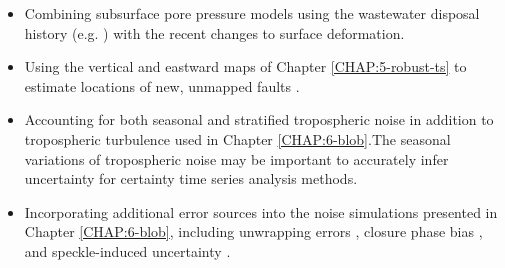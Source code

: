 \begin{itemize}



\item Combining subsurface pore pressure models using the wastewater disposal history (e.g. \cite{Ge2022RecentWaterDisposal}) with the recent changes to surface deformation.

\item Using the vertical and eastward maps of Chapter \ref{CHAP:5-robust-ts} to estimate locations of new, unmapped faults \citep{Horne2021BasementRootedFaults}.



\item Accounting for both seasonal and stratified tropospheric noise in addition to tropospheric turbulence used in Chapter \ref{CHAP:6-blob}.The seasonal variations of tropospheric noise may be important to accurately infer uncertainty for certainty time series analysis methods.

\item Incorporating additional error sources into the noise simulations presented in Chapter \ref{CHAP:6-blob}, including unwrapping errors \citep{Yunjun2019SmallBaselineInsar}, closure phase bias \citep{Zheng2022ClosurePhaseSystematic}, and speckle-induced uncertainty \citep{Zwieback2022ReliableInsarPhase}. 


\end{itemize}
